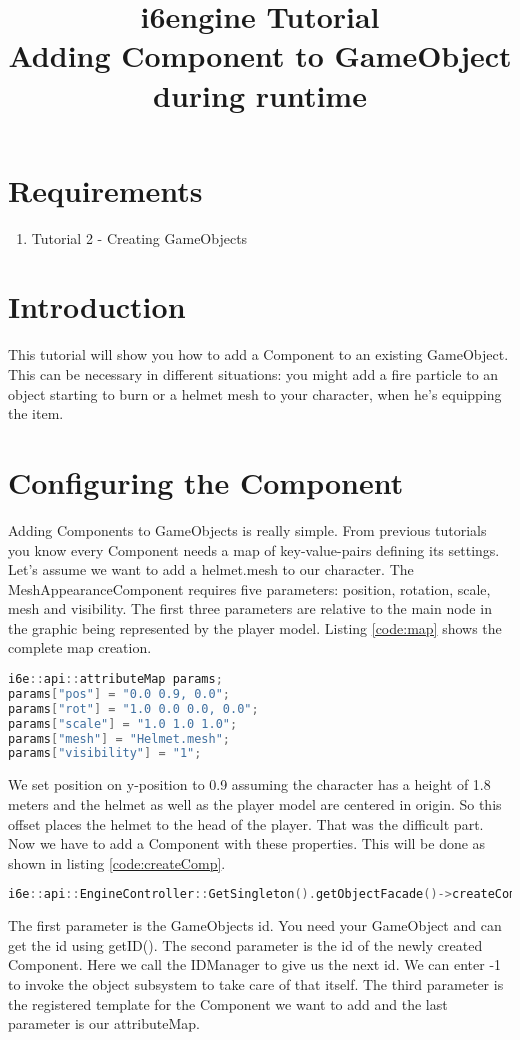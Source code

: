 \documentclass{article}
\title{i6engine Tutorial \\ Adding Component to GameObject during runtime}
\begin{document}
\section{Requirements}

\begin{enumerate}
\item Tutorial 2 - Creating GameObjects
\end{enumerate}

\section{Introduction}

This tutorial will show you how to add a Component to an existing GameObject. This can be necessary in different situations: you might add a fire particle to an object starting to burn or a helmet mesh to your character, when he's equipping the item.

\section{Configuring the Component}

Adding Components to GameObjects is really simple. From previous tutorials you know every Component needs a map of key-value-pairs defining its settings. Let's assume we want to add a helmet.mesh to our character. The MeshAppearanceComponent requires five parameters: position, rotation, scale, mesh and visibility. The first three parameters are relative to the main node in the graphic being represented by the player model. Listing \ref{code:map} shows the complete map creation.

\begin{lstlisting}[language=C++, style=basic, caption={configuring attributeMap}, label=code:map]
i6e::api::attributeMap params;
params["pos"] = "0.0 0.9, 0.0";
params["rot"] = "1.0 0.0 0.0, 0.0";
params["scale"] = "1.0 1.0 1.0";
params["mesh"] = "Helmet.mesh";
params["visibility"] = "1";
\end{lstlisting}

We set position on y-position to 0.9 assuming the character has a height of 1.8 meters and the helmet as well as the player model are centered in origin. So this offset places the helmet to the head of the player. That was the difficult part. Now we have to add a Component with these properties. This will be done as shown in listing \ref{code:createComp}.

\begin{lstlisting}[language=C++, style=basic, caption={create Component}, label=code:createComp]
i6e::api::EngineController::GetSingleton().getObjectFacade()->createComponent(goid, i6e::api::EngineController::GetSingleton().getIDManager()->getID(), "MeshAppearance", params);
\end{lstlisting}

The first parameter is the GameObjects id. You need your GameObject and can get the id using getID(). The second parameter is the id of the newly created Component. Here we call the IDManager to give us the next id. We can enter -1 to invoke the object subsystem to take care of that itself. The third parameter is the registered template for the Component we want to add and the last parameter is our attributeMap.
\end{document}
